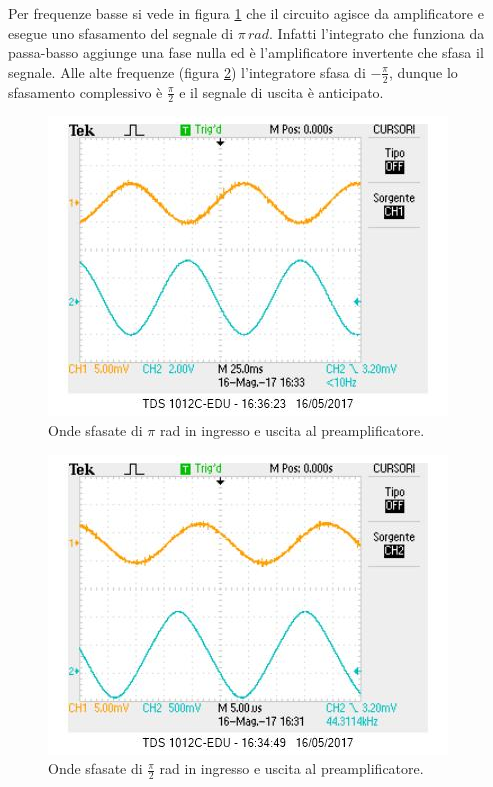\documentclass[10pt,a4paper]{article}
\begin{document}
Per frequenze basse si vede in figura \ref{integratoreBasso} che il circuito agisce da amplificatore e esegue uno sfasamento del segnale di $\pi \, rad$. Infatti l'integrato che funziona da passa-basso aggiunge una fase nulla ed è l'amplificatore invertente che sfasa il segnale. Alle alte frequenze (figura \ref{integratoreAlto}) l'integratore sfasa di $-\frac{\pi}{2}$, dunque lo sfasamento complessivo è $\frac{\pi}{2}$ e il segnale di uscita è anticipato.

\begin{figure}[!htb]
\centering
\includegraphics[scale=1.0]{integratoreBassaFrequenza.jpg}
\caption{Onde sfasate di $\pi$ rad in ingresso e uscita al preamplificatore.\label{integratoreBasso}}
\end{figure}

\begin{figure}[!htb]
\centering
\includegraphics[scale=1.0]{integratoreAltaFreq.jpg}
\caption{Onde sfasate di $\frac{\pi}{2}$ rad in ingresso e uscita al preamplificatore.\label{integratoreAlto}}
\end{figure}
\end{document}
